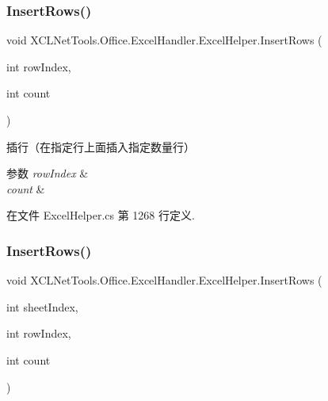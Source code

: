 \subsubsection{\texorpdfstring{Insert\+Rows()}{InsertRows()}\hspace{0.1cm}{\footnotesize\ttfamily [1/2]}}
{\footnotesize\ttfamily void X\+C\+L\+Net\+Tools.\+Office.\+Excel\+Handler.\+Excel\+Helper.\+Insert\+Rows (\begin{DoxyParamCaption}\item[{int}]{row\+Index,  }\item[{int}]{count }\end{DoxyParamCaption})}



插行（在指定行上面插入指定数量行） 


\begin{DoxyParams}{参数}
{\em row\+Index} & \\
\hline
{\em count} & \\
\hline
\end{DoxyParams}


在文件 Excel\+Helper.\+cs 第 1268 行定义.

\mbox{\label{class_x_c_l_net_tools_1_1_office_1_1_excel_handler_1_1_excel_helper_ae52b03c158a2db80aa61b3db05e9298c}} 
\subsubsection{\texorpdfstring{Insert\+Rows()}{InsertRows()}\hspace{0.1cm}{\footnotesize\ttfamily [2/2]}}
{\footnotesize\ttfamily void X\+C\+L\+Net\+Tools.\+Office.\+Excel\+Handler.\+Excel\+Helper.\+Insert\+Rows (\begin{DoxyParamCaption}\item[{int}]{sheet\+Index,  }\item[{int}]{row\+Index,  }\item[{int}]{count }\end{DoxyParamCaption})}



